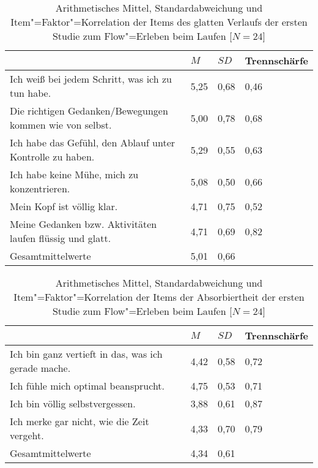 \begin{table}
	[!htb] \centering \caption[Item"=Faktor"=Korrelation der Items des glatten Verlaufs (Erste Studie: Laufen)]{Arithmetisches Mittel, Standardabweichung und Item"=Faktor"=Korrelation der Items des glatten Verlaufs der ersten Studie zum Flow"=Erleben beim Laufen [$N = 24$]} \label{tab:glatter_verlauf_1} 
	\begin{tabularx}
		{ 
		\textwidth}{p{} p{} p{} p{}} \toprule & $M$ & $SD$ & Trennschärfe \\
		\midrule Ich weiß bei jedem Schritt, was ich zu tun habe. & 5,25 & 0,68 & 0,46 \\
		Die richtigen Gedanken/Bewegungen kommen wie von selbst. & 5,00 & 0,78 & 0,68 \\
		Ich habe das Gefühl, den Ablauf unter Kontrolle zu haben. & 5,29 & 0,55 & 0,63 \\
		Ich habe keine Mühe, mich zu konzentrieren. & 5,08 & 0,50 & 0,66 \\
		Mein Kopf ist völlig klar. & 4,71 & 0,75 & 0,52 \\
		Meine Gedanken bzw. Aktivitäten laufen flüssig und glatt. & 4,71 & 0,69 & 0,82 \\
		Gesamtmittelwerte & 5,01 & 0,66 & \\
		\bottomrule 
	\end{tabularx}
\end{table}
\begin{table}
	[!htb] \centering \caption[Item"=Faktor"=Korrelation der Items der Absorbiertheit (Erste Studie: Laufen)]{Arithmetisches Mittel, Standardabweichung und Item"=Faktor"=Korrelation der Items der Absorbiertheit der ersten Studie zum Flow"=Erleben beim Laufen [$N = 24$]} \label{tab:absorbiertheit_1} 
	\begin{tabularx}
		{ 
		\textwidth}{p{} p{} p{} p{}} \toprule & $M$ & $SD$ & Trennschärfe \\
		\midrule Ich bin ganz vertieft in das, was ich gerade mache. & 4,42 & 0,58 & 0,72 \\
		Ich fühle mich optimal beansprucht. & 4,75 & 0,53 & 0,71 \\
		Ich bin völlig selbstvergessen. & 3,88 & 0,61 & 0,87 \\
		Ich merke gar nicht, wie die Zeit vergeht. & 4,33 & 0,70 & 0,79 \\
		Gesamtmittelwerte & 4,34 & 0,61 & \\
		\bottomrule 
	\end{tabularx}
\end{table}

